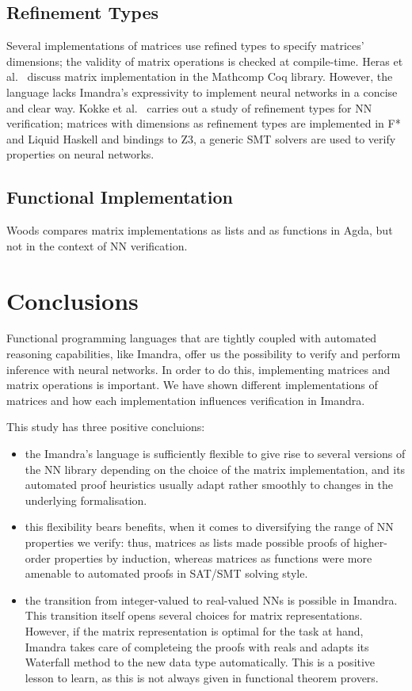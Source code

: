 \documentclass[runningheads]{llncs}
\begin{document}
\subsection{Refinement Types}
Several implementations of matrices use refined types to specify matrices' dimensions; the validity of matrix operations is checked at compile-time.
Heras et al.~\cite{heras_incidence_2011} discuss matrix implementation in the Mathcomp Coq library. However, the language lacks Imandra's expressivity to implement neural networks in a concise and clear way.
Kokke et al.~\cite{kokke_neural_2020} carries out a study of refinement types for NN verification; matrices with dimensions as refinement types are implemented in F* and Liquid Haskell and bindings to Z3, a generic SMT solvers are used to verify properties on neural networks.

\subsection{Functional Implementation}

Woods \cite{wood_vectors_2019} compares matrix implementations as lists and as functions in Agda, but not in the context of NN verification.
\fi


\section{Conclusions}
Functional programming languages that are tightly coupled with automated reasoning capabilities, like Imandra, offer us the possibility to verify and perform inference with neural networks. In order to do this, implementing matrices and matrix operations is important.
We have shown different implementations of matrices and how each implementation influences verification in Imandra.

This study has three positive concluions:
\begin{itemize}
\item the Imandra's language is sufficiently flexible to give rise to several versions of the NN library depending on the choice of the matrix implementation, and its automated proof heuristics
  usually adapt rather smoothly to changes in the underlying formalisation.

\item this flexibility bears benefits, when it comes to diversifying the range of NN properties we verify: thus, matrices as lists made possible proofs of higher-order properties by induction, whereas matrices as functions were more amenable to automated proofs in SAT/SMT solving style.

\item the transition from integer-valued to real-valued NNs is possible in Imandra. This transition itself opens several choices for matrix representations. However, if the matrix representation is optimal for the task at hand, Imandra takes care of completeing the proofs with reals and adapts its Waterfall method to the new data type automatically.
  This is a positive lesson to learn, as this is not always given in functional theorem provers.
\end{itemize}
\end{document}
